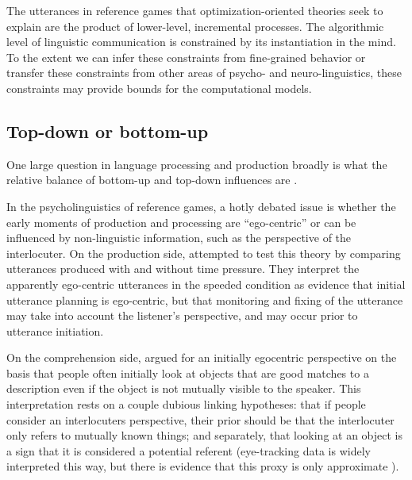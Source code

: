 \documentclass[]{article}
\begin{document}
The utterances in reference games that optimization-oriented theories seek to explain are the product of lower-level, incremental processes. The algorithmic level of linguistic communication is constrained by its instantiation in the mind. To the extent we can infer these constraints from fine-grained behavior or transfer these constraints from other areas of psycho- and neuro-linguistics, these constraints may provide bounds for the computational models. 





\subsection{Top-down or bottom-up}
One large question in language processing and production broadly is what the relative balance of bottom-up and top-down influences are \citep{gwilliams2022,tanenhaus1995,horton2005, horton1996}. 

In the psycholinguistics of reference games, a hotly debated issue is whether the early moments of production and processing are ``ego-centric'' or can be influenced by non-linguistic information, such as the perspective of the interlocuter. On the production side, \citet{horton1996} attempted to test this theory by comparing utterances produced with and without time pressure. They interpret the apparently ego-centric utterances in the speeded condition as evidence that initial utterance planning is ego-centric, but that monitoring and fixing of the utterance may take into account the listener's perspective, and may occur prior to utterance initiation. 

On the comprehension side, \citet{keysar2000} argued for an initially egocentric perspective on the basis that people often initially look at objects that are good matches to a description even if the object is not mutually visible to the speaker. This interpretation rests on a couple dubious linking hypotheses: that if people consider an interlocuters perspective, their prior should be that the interlocuter only refers to mutually known things;  and separately, that looking at an object is a sign that it is considered a potential referent (eye-tracking data is widely interpreted this way, but there is evidence that this proxy is only approximate \citet{degena}).
\end{document}
